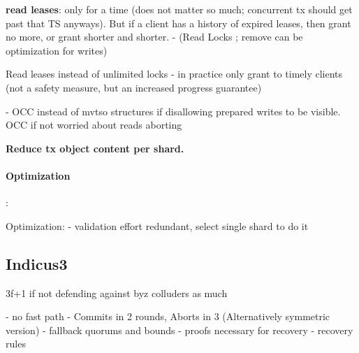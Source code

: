 \fi



\textbf{read leases}: only for a time (does not matter so much; concurrent tx should get past that TS anyways). But if a client has a history of expired leases, then grant no more, or grant shorter and shorter.
- (Read Locks ; remove can be optimization for writes)

 Read leases instead of unlimited locks - in practice only grant to timely clients (not a safety measure, but an increased progress guarantee)

- OCC instead of mvtso structures if disallowing prepared writes to be visible. OCC if not worried about reads aborting



\textbf{Reduce tx object content per shard.}

\paragraph{Optimization}: 


Optimization:
- validation effort redundant, select single shard to do it


\subsection{Indicus3}
3f+1 if not defending against byz colluders as much

- no fast path
- Commits in 2 rounds, Aborts in 3 (Alternatively symmetric version)
- fallback quorums and bounds
- proofs necessary for recovery
- recovery rules

